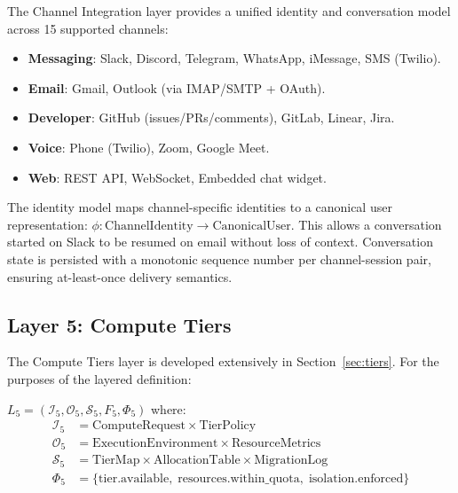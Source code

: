 The Channel Integration layer provides a unified identity and conversation
model across 15 supported channels:
\begin{itemize}[leftmargin=1.5em, itemsep=0pt]
    \item \textbf{Messaging}: Slack, Discord, Telegram, WhatsApp, iMessage,
          SMS (Twilio).
    \item \textbf{Email}: Gmail, Outlook (via IMAP/SMTP + OAuth).
    \item \textbf{Developer}: GitHub (issues/PRs/comments), GitLab, Linear,
          Jira.
    \item \textbf{Voice}: Phone (Twilio), Zoom, Google Meet.
    \item \textbf{Web}: REST API, WebSocket, Embedded chat widget.
\end{itemize}

The identity model maps channel-specific identities to a canonical user
representation: $\phi : \text{ChannelIdentity} \to \text{CanonicalUser}$.
This allows a conversation started on Slack to be resumed on email without
loss of context. Conversation state is persisted with a monotonic sequence
number per channel-session pair, ensuring at-least-once delivery semantics.

\subsection{Layer 5: Compute Tiers}

The Compute Tiers layer is developed extensively in Section~\ref{sec:tiers}.
For the purposes of the layered definition:

\begin{definition}
    $L_5 = \left(\mathcal{I}_5, \mathcal{O}_5, \mathcal{S}_5, F_5, \Phi_5\right)$ where:
    \begin{align*}
        \mathcal{I}_5 &= \text{ComputeRequest} \times \text{TierPolicy} \\
        \mathcal{O}_5 &= \text{ExecutionEnvironment} \times \text{ResourceMetrics} \\
        \mathcal{S}_5 &= \text{TierMap} \times \text{AllocationTable} \times
                         \text{MigrationLog} \\
        \Phi_5 &= \{\text{tier.available},\; \text{resources.within\_quota},\;
                    \text{isolation.enforced}\}
    \end{align*}
\end{definition}

